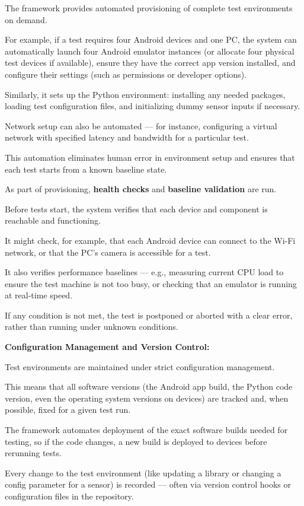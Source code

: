 {{{The framework provides automated provisioning of complete test environments on demand.

For example, if a test requires four Android devices and one PC, the system can automatically launch four Android emulator instances (or allocate four physical test devices if available), ensure they have the correct app version installed, and configure their settings (such as permissions or developer options).

Similarly, it sets up the Python environment: installing any needed packages, loading test configuration files, and initializing dummy sensor inputs if necessary.

Network setup can also be automated --- for instance, configuring a virtual network with specified latency and bandwidth for a particular test.

This automation eliminates human error in environment setup and ensures that each test starts from a known baseline state.

As part of provisioning, \textbf{health checks}
 and \textbf{baseline validation}
 are run.

Before tests start, the system verifies that each device and component is reachable and functioning.

It might check, for example, that each Android device can connect to the Wi-Fi network, or that the PC's camera is accessible for a test.

It also verifies performance baselines --- e.g., measuring current CPU load to ensure the test machine is not too busy, or checking that an emulator is running at real-time speed.

If any condition is not met, the test is postponed or aborted with a clear error, rather than running under unknown conditions.

\textbf{Configuration Management and Version Control:}

Test environments are maintained under strict configuration management.

This means that all software versions (the Android app build, the Python code version, even the operating system versions on devices) are tracked and, when possible, fixed for a given test run.

The framework automates deployment of the exact software builds needed for testing, so if the code changes, a new build is deployed to devices before rerunning tests.

Every change to the test environment (like updating a library or changing a config parameter for a sensor) is recorded --- often via version control hooks or configuration files in the repository.

}}}
